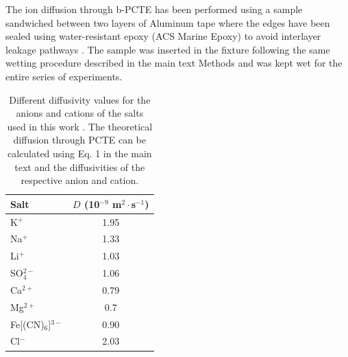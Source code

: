 \documentclass[manuscript=suppinfo,email=true, hyperref=true, keywords=false]{achemso}
\begin{document}
The ion diffusion through b-PCTE has been performed using a sample
sandwiched between two layers of Aluminum tape where the edges have
been sealed using water-resistant epoxy (ACS Marine Epoxy) to avoid
interlayer leakage pathways \cite{Choi_2018}.  The sample was inserted in
the fixture following the same wetting procedure described in the main
text Methods and was kept wet for the entire series of experiments.

\begin{table}[htbp]
  \centering
  \begin{tabular}{lc}
    \hline
    Salt & $D$ (10$^{-9}$ m$^{2}\cdot$s$^{-1}$) \\
    \hline
    K$^{+}$     & 1.95 \\
    Na$^{+}$    & 1.33 \\
    Li$^{+}$    & 1.03 \\
    SO$_{4}^{2-}$       & 1.06 \\
    Ca$^{2+}$   & 0.79\\
    Mg$^{2+}$ & 0.7\\
    Fe{[(CN)$_{6}$]}$^{3-}$   & 0.90\\
    Cl$^{-}$ &  2.03 \\
               \hline
  \end{tabular}
  \caption{Different diffusivity values for the anions and cations of the
    salts used in this work \cite{vanysek_2000}. The theoretical
    diffusion through PCTE can be calculated using Eq. 1 in the main
    text and the diffusivities of the respective anion and cation.}
  \label{tab:diff}
\end{table}
\end{document}
